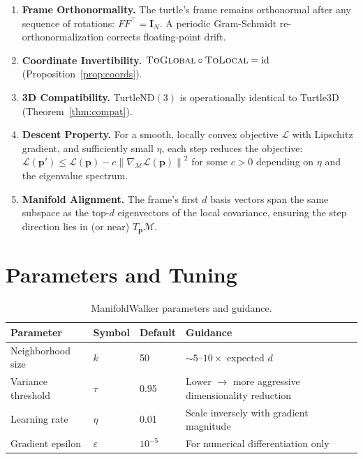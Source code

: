 \documentclass[11pt,letterpaper]{article}
\newcommand{\pos}{\mathbf{p}}
\newcommand{\grad}{\nabla}
\newcommand{\manifold}{\mathcal{M}}
\newcommand{\tangent}{T}
\newcommand{\obj}{\mathcal{L}}
\newcommand{\eye}{\mathbf{I}}
\newcommand{\norm}[1]{\left\lVert #1 \right\rVert}
\begin{document}
\begin{enumerate}[label=\textbf{P\arabic*.}, ref=P\arabic*]
  \item \label{prop:ortho} \textbf{Frame Orthonormality.} The turtle's frame remains orthonormal after any sequence of rotations: $FF^\top = \eye_N$. A periodic Gram-Schmidt re-orthonormalization corrects floating-point drift.

  \item \label{prop:invert} \textbf{Coordinate Invertibility.} $\textsc{ToGlobal} \circ \textsc{ToLocal} = \mathrm{id}$ (Proposition~\ref{prop:coords}).

  \item \label{prop:compat} \textbf{3D Compatibility.} TurtleND$(3)$ is operationally identical to Turtle3D (Theorem~\ref{thm:compat}).

  \item \label{prop:descent} \textbf{Descent Property.} For a smooth, locally convex objective $\obj$ with Lipschitz gradient, and sufficiently small $\eta$, each step reduces the objective: $\obj(\pos') \leq \obj(\pos) - c \norm{\grad_\manifold \obj(\pos)}^2$ for some $c > 0$ depending on $\eta$ and the eigenvalue spectrum.

  \item \label{prop:manifold} \textbf{Manifold Alignment.} The frame's first $d$ basis vectors span the same subspace as the top-$d$ eigenvectors of the local covariance, ensuring the step direction lies in (or near) $\tangent_\pos \manifold$.
\end{enumerate}

\section{Parameters and Tuning}
\label{sec:params}

\begin{table}[h]
\centering
\caption{ManifoldWalker parameters and guidance.}
\label{tab:params}
\begin{tabular}{@{}llll@{}}
\toprule
\textbf{Parameter} & \textbf{Symbol} & \textbf{Default} & \textbf{Guidance} \\
\midrule
Neighborhood size & $k$ & 50 & $\sim 5$--$10\times$ expected $d$ \\
Variance threshold & $\tau$ & 0.95 & Lower $\to$ more aggressive dimensionality reduction \\
Learning rate & $\eta$ & 0.01 & Scale inversely with gradient magnitude \\
Gradient epsilon & $\varepsilon$ & $10^{-5}$ & For numerical differentiation only \\
\bottomrule
\end{tabular}
\end{table}
\end{document}
